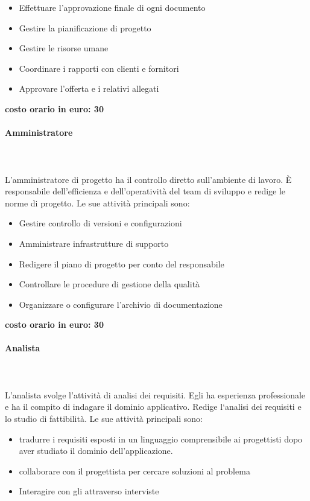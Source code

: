 \documentclass[../norme-di-progetto.tex]{subfiles}
\begin{document}
\begin{itemize}
  \item Effettuare l'approvazione finale di ogni documento
  \item Gestire la pianificazione di progetto
  \item Gestire le risorse umane
  \item Coordinare i rapporti con clienti e fornitori
  \item Approvare l'offerta e i relativi allegati
\end{itemize}

\textbf{costo orario in euro: 30}
\paragraph{Amministratore}\mbox{}\\
\label{par:amministratore}
\\L'amministratore di progetto ha il controllo diretto sull'ambiente di lavoro. È responsabile dell'efficienza e dell'operatività del team di sviluppo e redige le norme di progetto. Le sue attività principali sono:

\begin{itemize}
  \item Gestire controllo di versioni e configurazioni
  \item Amministrare infrastrutture di supporto
  \item Redigere il piano di progetto per conto del responsabile
  \item Controllare le procedure di gestione della qualità
  \item Organizzare o configurare l'archivio di documentazione
\end{itemize}

\textbf{costo orario in euro: 30}
\paragraph{Analista}\mbox{}\\
\label{par:analista}
\\L'analista svolge l'attività di analisi dei requisiti.
Egli ha esperienza professionale e ha il compito di indagare il dominio applicativo.
Redige l`analisi dei requisiti e lo studio di fattibilità. Le sue attività principali sono:

\begin{itemize}
  \item tradurre i requisiti esposti in un linguaggio comprensibile ai progettisti dopo aver studiato il dominio dell'applicazione.
  \item collaborare con il progettista per cercare soluzioni al problema
  \item Interagire con gli  attraverso interviste
\end{itemize}
\end{document}
